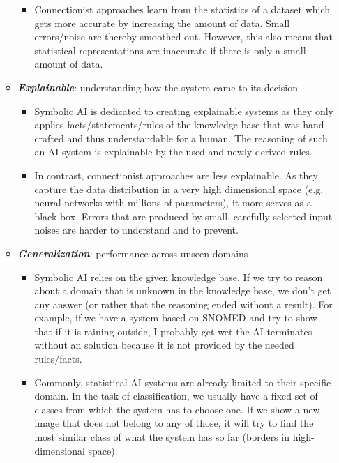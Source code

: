 \begin{itemize}
\begin{itemize}
\begin{itemize}
			\item Connectionist approaches learn from the statistics of a dataset which gets more accurate by increasing the amount of data. Small errors/noise are thereby smoothed out. However, this also means that statistical representations are inaccurate if there is only a small amount of data. 
		\end{itemize}
		\item \textit{\textbf{Explainable}}: understanding how the system came to its decision
		\begin{itemize}
			\item Symbolic AI is dedicated to creating explainable systems as they only applies facts/statements/rules of the knowledge base that was hand-crafted and thus understandable for a human. The reasoning of such an AI system is explainable by the used and newly derived rules.
			\item In contrast, connectionist approaches are less explainable. As they capture the data distribution in a very high dimensional space (e.g. neural networks with millions of parameters), it more serves as a black box. Errors that are produced by small, carefully selected input noises are harder to understand and to prevent. 
		\end{itemize}
		\item \textit{\textbf{Generalization}}: performance across unseen domains
		\begin{itemize}
			\item Symbolic AI relies on the given knowledge base. If we try to reason about a domain that is unknown in the knowledge base, we don't get any answer (or rather that the reasoning ended without a result). For example, if we have a system based on SNOMED and try to show that if it is raining outside, I probably get wet the AI terminates without an solution because it is not provided by the needed rules/facts.
			\item Commonly, statistical AI systems are already limited to their specific domain. In the task of classification, we usually have a fixed set of classes from which the system has to choose one. If we show a new image that does not belong to any of those, it will try to find the most similar class of what the system has so far (borders in high-dimensional space).
		\end{itemize}
	\end{itemize}
	
\end{itemize}